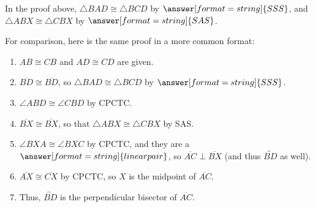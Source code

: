 \documentclass[nooutcomes]{ximera}
\begin{document}
\begin{problem}
In the proof above, $\triangle BAD \cong \triangle BCD$ by $\answer[format=string]{SSS}$, and $\triangle ABX \cong \triangle CBX$ by $\answer[format=string]{SAS}$.  

\begin{problem}
For comparison, here is the same proof in a more common format:
\begin{enumerate}
\item $AB\cong CB$ and $AD\cong CD$ are given.  
\item $\overline{BD}\cong \overline{BD}$, so $\triangle BAD \cong \triangle BCD$ by $\answer[format=string]{SSS}$.  
\item $\angle ABD \cong \angle CBD$ by CPCTC. 
\item $\overline{BX}\cong \overline{BX}$, so that $\triangle ABX \cong \triangle CBX$ by SAS.  
\item $\angle BXA \cong \angle BXC$ by CPCTC, and they are a $\answer[format=string]{linear pair}$, 
so $\overline{AC}\perp\overline{BX}$ (and thus $\overleftrightarrow{BD}$ as well). 
\item $\overline{AX}\cong \overline{CX}$ by CPCTC, so $X$ is the midpoint of $\overline{AC}$.
\item Thus, $\overleftrightarrow{BD}$ is the perpendicular bisector of $\overline{AC}$.
\end{enumerate}
\end{problem}
\end{problem}
\end{document}

